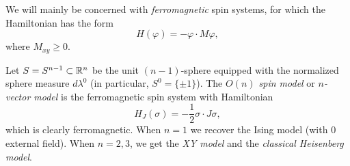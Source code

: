 We will mainly be concerned with \emph{ferromagnetic} spin systems, for which the
Hamiltonian has the form
\begin{equation}
H(\varphi) = -\varphi \cdot M\varphi,
\end{equation}
where $M_{xy} \ge 0$.



\begin{example}
Let $S = S^{n-1} \subset {\mathbb R}^n$ be the unit $(n-1)$-sphere equipped with the
normalized sphere measure $d\lambda^0$ (in particular, $S^0 = \{ \pm 1 \}$).
The \emph{$O(n)$ spin model} or \emph{$n$-vector model} is the ferromagnetic
spin system with Hamiltonian
\begin{equation}
H_J(\sigma) = -\frac{1}{2} \sigma \cdot J \sigma,
\end{equation}
which is clearly ferromagnetic. When $n = 1$ we recover the Ising model (with
$0$ external field). When $n = 2, 3$, we get the \emph{XY model} and the
\emph{classical Heisenberg model}.
\end{example}



